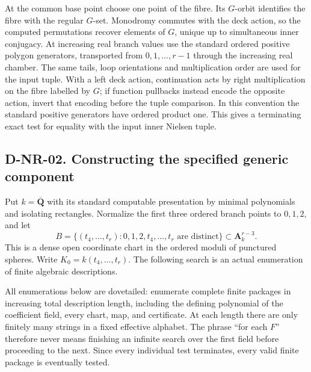 At the common base point choose one point of the fibre.  Its $G$-orbit
identifies the fibre with the regular $G$-set.  Monodromy commutes with the
deck action, so the computed permutations recover elements of $G$, unique
up to simultaneous inner conjugacy.  At increasing real branch values
use the standard ordered positive polygon generators, transported from
$0,1,\ldots,r-1$ through the increasing real chamber.  The same tails,
loop orientations and multiplication order are used for the input tuple.
With a left deck action, continuation acts by right multiplication on
the fibre labelled by $G$; if function pullbacks instead encode the
opposite action, invert that encoding before the tuple comparison.
In this convention the standard positive generators have ordered product
one.  This gives a
terminating exact test for equality with the input inner Nielsen tuple.

\subsection*{D-NR-02. Constructing the specified generic component}

Put $k=\overline{\mathbf Q}$ with its standard computable presentation by
minimal polynomials and isolating rectangles.  Normalize the first three
ordered branch points to $0,1,2$, and let
\[
 B=\{(t_4,\ldots,t_r):0,1,2,t_4,\ldots,t_r
                  \text{ are distinct}\}\subset\mathbf A^{r-3}_k.
                                                               \tag{NR.3}
\]
This is a dense open coordinate chart in the ordered moduli of punctured
spheres.  Write $K_0=k(t_4,\ldots,t_r)$.  The following search is an actual
enumeration of finite algebraic descriptions.

All enumerations below are dovetailed: enumerate complete finite packages
in increasing total description length, including the defining polynomial
of the coefficient field, every chart, map, and certificate.  At each length
there are only finitely many strings in a fixed effective alphabet.  The
phrase ``for each $F$'' therefore never means finishing an infinite search
over the first field before proceeding to the next.  Since every individual
test terminates, every valid finite package is eventually tested.

